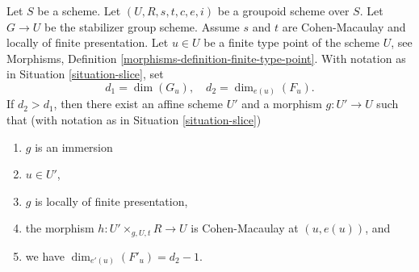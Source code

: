 %
\begin{lemma}
\label{lemma-slice}
Let $S$ be a scheme.
Let $(U, R, s, t, c, e, i)$ be a groupoid scheme over $S$.
Let $G \to U$ be the stabilizer group scheme.
Assume $s$ and $t$ are Cohen-Macaulay and locally of finite presentation.
Let $u \in U$ be a finite type point of the scheme $U$, see
Morphisms, Definition \ref{morphisms-definition-finite-type-point}.
With notation as in
Situation \ref{situation-slice},
set
$$
d_1 = \dim(G_u), \quad
d_2 = \dim_{e(u)}(F_u).
$$
If $d_2 > d_1$, then there exist an affine scheme $U'$
and a morphism $g : U' \to U$ such that (with notation as in
Situation \ref{situation-slice})
\begin{enumerate}
\item $g$ is an immersion
\item $u \in U'$,
\item $g$ is locally of finite presentation,
\item the morphism $h : U' \times_{g, U, t} R \longrightarrow U$
is Cohen-Macaulay at $(u, e(u))$, and
\item we have $\dim_{e'(u)}(F'_u) = d_2 - 1$.
\end{enumerate}
\end{lemma}

